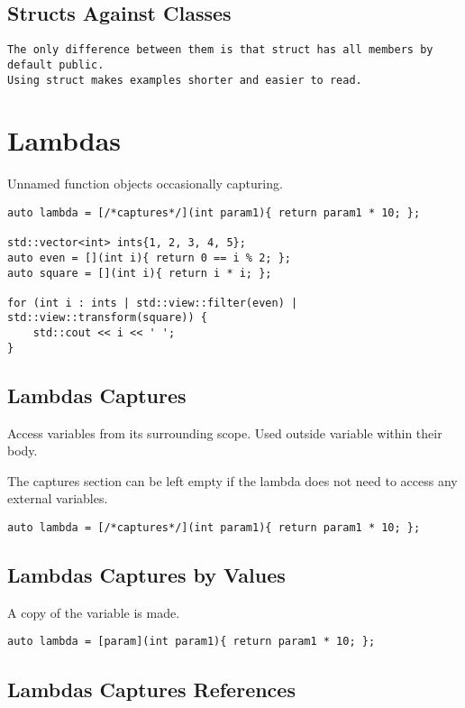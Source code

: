 \documentclass[openany]{report}
\begin{document}
\subsection{Structs Against Classes}
\begin{verbatim}
The only difference between them is that struct has all members by default public.
Using struct makes examples shorter and easier to read. 
\end{verbatim}

\section{Lambdas}

Unnamed function objects occasionally capturing.

\begin{verbatim}
auto lambda = [/*captures*/](int param1){ return param1 * 10; };

std::vector<int> ints{1, 2, 3, 4, 5};
auto even = [](int i){ return 0 == i % 2; };
auto square = [](int i){ return i * i; }; 

for (int i : ints | std::view::filter(even) | std::view::transform(square)) {
    std::cout << i << ' ';
}
\end{verbatim}

\subsection{Lambdas Captures}

Access variables from its surrounding scope.
Used outside variable within their body.

The captures section can be left empty if
the lambda does not need to access any external variables.

\begin{verbatim}
auto lambda = [/*captures*/](int param1){ return param1 * 10; };
\end{verbatim}

\subsection{Lambdas Captures by Values}

A copy of the variable is made.

\begin{verbatim}
auto lambda = [param](int param1){ return param1 * 10; };
\end{verbatim}

\subsection{Lambdas Captures References}
\end{document}
